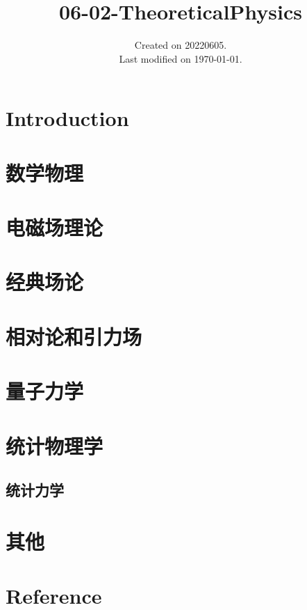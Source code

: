 \documentclass[UTF8]{../06-Physics}
\begin{document}
\title{06-02-TheoreticalPhysics}
\date{Created on 20220605.\\   Last modified on \today.}
\maketitle
\tableofcontents


\chapter{Introduction}


\chapter{数学物理}
\chapter{电磁场理论}
\chapter{经典场论}
\chapter{相对论和引力场}


\chapter{量子力学} %




\chapter{统计物理学} %
\section{统计力学}

\chapter{其他}



\chapter{Reference}
\end{document}
